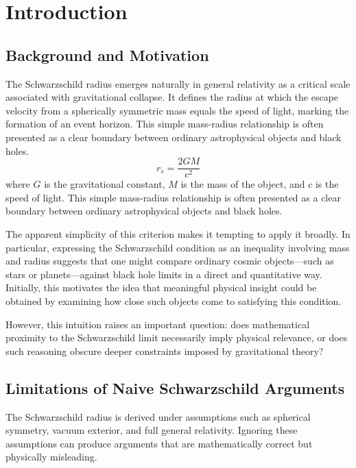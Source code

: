 \documentclass[12pt,a4paper]{article}
\begin{document}
\newpage

\section{Introduction}

\subsection{Background and Motivation}

The Schwarzschild radius emerges naturally in general relativity as a critical scale associated with gravitational collapse. It defines the radius at which the escape velocity from a spherically symmetric mass equals the speed of light, marking the formation of an event horizon. This simple mass-radius relationship is often presented as a clear boundary between ordinary astrophysical objects and black holes.
\begin{equation}
r_s = \frac{2GM}{c^2}
\end{equation}
where $G$ is the gravitational constant, $M$ is the mass of the object, and $c$ is the speed of light. This simple mass-radius relationship is often presented as a clear boundary between ordinary astrophysical objects and black holes.

The apparent simplicity of this criterion makes it tempting to apply it broadly. In particular, expressing the Schwarzschild condition as an inequality involving mass and radius suggests that one might compare ordinary cosmic objects—such as stars or planets—against black hole limits in a direct and quantitative way. Initially, this motivates the idea that meaningful physical insight could be obtained by examining how close such objects come to satisfying this condition.

However, this intuition raises an important question: does mathematical proximity to the Schwarzschild limit necessarily imply physical relevance, or does such reasoning obscure deeper constraints imposed by gravitational theory?

\subsection{Limitations of Naive Schwarzschild Arguments}

The Schwarzschild radius is derived under assumptions such as spherical symmetry, vacuum exterior, and full general relativity. Ignoring these assumptions can produce arguments that are mathematically correct but physically misleading.
\end{document}
